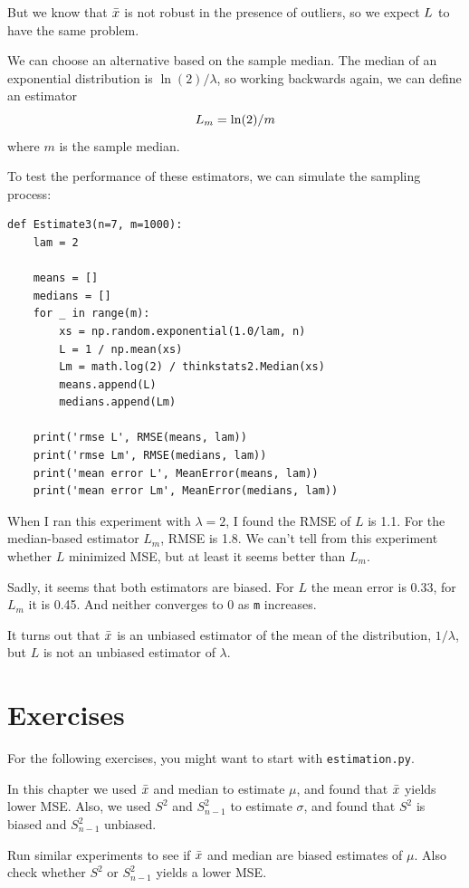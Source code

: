 \documentclass[12pt]{book}
\begin{document}
But we know that $\bar{x}$ is not robust in the presence of outliers, so
we expect $L$ to have the same problem.

We can choose an alternative based on the sample median.
The median of an exponential distribution is $\ln(2) / \lambda$,
so working backwards again, we can define an estimator
%
\[ L_m = \ln(2) / m \]
%
where $m$ is the sample median.

To test the performance of these estimators, we can simulate the
sampling process:

\begin{verbatim}
def Estimate3(n=7, m=1000):
    lam = 2

    means = []
    medians = []
    for _ in range(m):
        xs = np.random.exponential(1.0/lam, n)
        L = 1 / np.mean(xs)
        Lm = math.log(2) / thinkstats2.Median(xs)
        means.append(L)
        medians.append(Lm)

    print('rmse L', RMSE(means, lam))
    print('rmse Lm', RMSE(medians, lam))
    print('mean error L', MeanError(means, lam))
    print('mean error Lm', MeanError(medians, lam))
\end{verbatim}

When I ran this experiment with $\lambda=2$, I found the RMSE of $L$ is 
1.1.  For the median-based estimator $L_m$, RMSE is 1.8.  We can't
tell from this experiment whether $L$ minimized MSE, but at least
it seems better than $L_m$.

Sadly, it seems that both estimators are biased.  For $L$ the mean
error is 0.33, for $L_m$ it is 0.45.  And neither converges to 0
as {\tt m} increases.

It turns out that $\bar{x}$ is an unbiased estimator of the mean
of the distribution, $1 / \lambda$, but $L$ is not an unbiased
estimator of $\lambda$.


\section{Exercises}

For the following exercises, you might want to start with
{\tt estimation.py}.  

\begin{exercise}

In this chapter we used $\bar{x}$ and median to estimate $\mu$, and
found that $\bar{x}$  yields lower MSE.
Also, we used $S^2$ and $S_{n-1}^2$ to estimate $\sigma$, and found that
$S^2$ is biased and $S_{n-1}^2$ unbiased.

Run similar experiments to see if $\bar{x}$ and median are biased estimates
of $\mu$.
Also check whether $S^2$ or $S_{n-1}^2$ yields a lower MSE.

\end{exercise}
\end{document}
